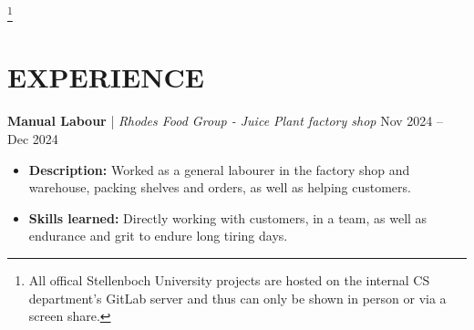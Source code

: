 \documentclass[11pt,a4paper]{article}
\begin{document}
\vspace{8pt}


\footnote{All offical Stellenboch University projects are hosted on the internal CS department's GitLab server
and thus can only be shown in person or via a screen share.}
	\renewcommand{\thefootnote}{\arabic{footnote}}


\section{EXPERIENCE}
\textbf{Manual Labour} | \textit{Rhodes Food Group - Juice Plant factory shop}
\hfill Nov 2024 -- Dec 2024

	\vspace{5pt}


\begin{itemize}
	\item \textbf{Description:} Worked as a general labourer in the factory shop
		and warehouse, packing shelves and orders, as well as helping customers.

	\vspace{2pt}


	\item \textbf{Skills learned:} Directly working with customers, in a team, as
		well as endurance and grit to endure long tiring days.
\end{itemize}

\newpage

\end{document}
